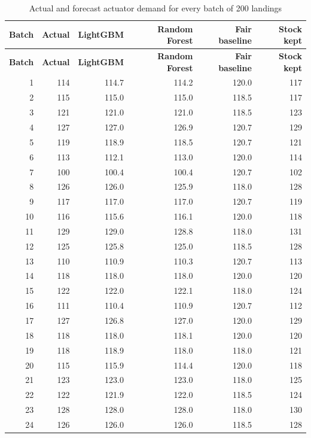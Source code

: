 \documentclass[12pt,oneside]{report}
\begin{document}
\begin{singlespace}\small
\begin{longtable}{@{}rrrrrr@{}}
\caption[Forecasts for every batch]{Actual and forecast actuator demand for every batch of 200 landings}\label{tab:batches}\\
\toprule
\textbf{Batch} & \textbf{Actual} & \textbf{LightGBM} & \textbf{Random Forest} & \textbf{Fair baseline} & \textbf{Stock kept}\\
\midrule
\endfirsthead
\toprule
\textbf{Batch} & \textbf{Actual} & \textbf{LightGBM} & \textbf{Random Forest} & \textbf{Fair baseline} & \textbf{Stock kept}\\
\midrule
\endhead
1 & 114 & 114.7 & 114.2 & 120.0 & 117\\
2 & 115 & 115.0 & 115.0 & 118.5 & 117\\
3 & 121 & 121.0 & 121.0 & 118.5 & 123\\
4 & 127 & 127.0 & 126.9 & 120.7 & 129\\
5 & 119 & 118.9 & 118.5 & 120.7 & 121\\
6 & 113 & 112.1 & 113.0 & 120.0 & 114\\
7 & 100 & 100.4 & 100.4 & 120.7 & 102\\
8 & 126 & 126.0 & 125.9 & 118.0 & 128\\
9 & 117 & 117.0 & 117.0 & 120.7 & 119\\
10 & 116 & 115.6 & 116.1 & 120.0 & 118\\
11 & 129 & 129.0 & 128.8 & 118.0 & 131\\
12 & 125 & 125.8 & 125.0 & 118.5 & 128\\
13 & 110 & 110.9 & 110.3 & 120.7 & 113\\
14 & 118 & 118.0 & 118.0 & 120.0 & 120\\
15 & 122 & 122.0 & 122.1 & 118.0 & 124\\
16 & 111 & 110.4 & 110.9 & 120.7 & 112\\
17 & 127 & 126.8 & 127.0 & 120.0 & 129\\
18 & 118 & 118.0 & 118.1 & 120.0 & 120\\
19 & 118 & 118.9 & 118.0 & 118.0 & 121\\
20 & 115 & 115.9 & 114.4 & 120.0 & 118\\
21 & 123 & 123.0 & 123.0 & 118.0 & 125\\
22 & 122 & 121.9 & 122.0 & 118.5 & 124\\
23 & 128 & 128.0 & 128.0 & 118.0 & 130\\
24 & 126 & 126.0 & 126.0 & 118.5 & 128\\

\end{longtable}
\end{singlespace}
\end{document}
